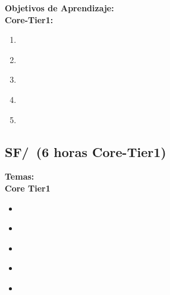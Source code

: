 \noindent \textbf{Objetivos de Aprendizaje:}\\
\noindent \textbf{Core-Tier1:}
\begin{enumerate}
	\setcounter{enumi}{0}
	\item \SFCrossLayerCommunicationsLODescribeHowAreLayers\xspace[\SFCrossLayerCommunicationsLODescribeHowAreLayersLevel]\label{sec:BOK:SFCrossLayerCommunicationsLODescribeHowAreLayers}
	\item \SFCrossLayerCommunicationsLODescribeThat\xspace[\SFCrossLayerCommunicationsLODescribeThatLevel]\label{sec:BOK:SFCrossLayerCommunicationsLODescribeThat}
	\item \SFCrossLayerCommunicationsLODescribeTheHow\xspace[\SFCrossLayerCommunicationsLODescribeTheHowLevel]\label{sec:BOK:SFCrossLayerCommunicationsLODescribeTheHow}
	\item \SFCrossLayerCommunicationsLOConstructAUsing\xspace[\SFCrossLayerCommunicationsLOConstructAUsingLevel]\label{sec:BOK:SFCrossLayerCommunicationsLOConstructAUsing}
	\item \SFCrossLayerCommunicationsLOFind\xspace[\SFCrossLayerCommunicationsLOFindLevel]\label{sec:BOK:SFCrossLayerCommunicationsLOFind}
\end{enumerate}


\subsection{SF/\SFStateandStateMachines~(6 horas Core-Tier1)}\label{sec:BOK:SFStateandStateMachines}
\noindent \textbf{Temas:}\\
\noindent \textbf{Core Tier1}
\begin{itemize}
	\item \SFStateandStateMachinesTopicDigital\label{sec:BOK:SFStateandStateMachinesTopicDigital}
	\item \SFStateandStateMachinesTopicSimple\label{sec:BOK:SFStateandStateMachinesTopicSimple}
	\item \SFStateandStateMachinesTopicClocks\label{sec:BOK:SFStateandStateMachinesTopicClocks}
	\item \SFStateandStateMachinesTopicCombinational\label{sec:BOK:SFStateandStateMachinesTopicCombinational}
	\item \SFStateandStateMachinesTopicComputers\label{sec:BOK:SFStateandStateMachinesTopicComputers}
\end{itemize}


